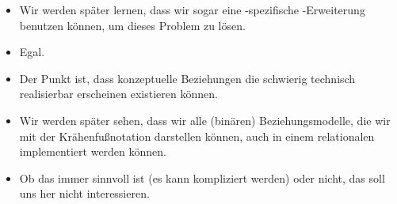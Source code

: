 \documentclass[aspectratio=169,mathserif,notheorems]{beamer}%
\begin{document}
\begin{frame}[t]
\begin{itemize}
%
\item<28-> Wir werden später lernen, dass wir sogar eine \postgresql-spezifische -Erweiterung benutzen können, um dieses Problem zu lösen.%
%
\item<29-> Egal.%
%
\item<30-> Der Punkt ist, dass konzeptuelle Beziehungen die schwierig technisch realisierbar erscheinen existieren können.%
%
\item<31-> Wir werden später sehen, dass wir alle (binären) Beziehungsmodelle, die wir mit der Krähenfußnotation darstellen können, auch in einem relationalen  implementiert werden können.%
%
\item<32-> Ob das immer sinnvoll ist (es kann kompliziert werden) oder nicht, das soll uns her nicht interessieren.%
\end{itemize}%
\end{frame}%
%
%
\end{document}
